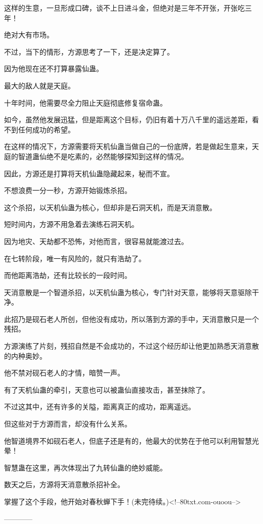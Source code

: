 \begin{this_body}
这样的生意，一旦形成口碑，谈不上日进斗金，但绝对是三年不开张，开张吃三年！

绝对大有市场。

不过，当下的情形，方源思考了一下，还是决定算了。

因为他现在还不打算暴露仙蛊。

最大的敌人就是天庭。

十年时间，他需要尽全力阻止天庭彻底修复宿命蛊。

如今，虽然他发展迅猛，但是距离这个目标，仍旧有着十万八千里的遥远差距，看不到任何成功的希望。

在这样的情况下，方源需要将天机仙蛊当做自己的一份底牌，若是做起生意来，天庭的智道蛊仙绝不是吃素的，必然能够探知到这样的情况。

因此，方源还是打算将天机仙蛊隐藏起来，秘而不宣。

不想浪费一分一秒，方源开始锻炼杀招。

这个杀招，以天机仙蛊为核心，但却非是石洞天机，而是天消意散。

短时间内，方源不用急着去演练石洞天机。

因为地灾、天劫都不恐怖，对他而言，很容易就能渡过去。

在七转阶段，唯一有风险的，就只有浩劫了。

而他距离浩劫，还有比较长的一段时间。

天消意散是一个智道杀招，以天机仙蛊为核心，专门针对天意，能够将天意驱除干净。

此招乃是砚石老人所创，但他没有成功，所以落到方源的手中，天消意散只是一个残招。

方源演练了片刻，残招自然是不会成功的，不过这个经历却让他更加熟悉天消意散的内种奥妙。

他不禁对砚石老人的才情，暗赞一声。

有了天机仙蛊的牵引，天意也可以被蛊仙直接攻击，甚至抹除了。

不过这其中，还有许多的关隘，距离真正的成功，距离遥远。

但这些对于方源而言，却没有什么关系。

他智道境界不如砚石老人，但底子还是有的，他最大的优势在于他可以利用智慧光晕！

智慧蛊在这里，再次体现出了九转仙蛊的绝妙威能。

数天之后，方源将天消意散杀招补全。

掌握了这个手段，他开始对春秋蝉下手！(未完待续。)<!--80txt.com-ouoou-->

------------

\end{this_body}


